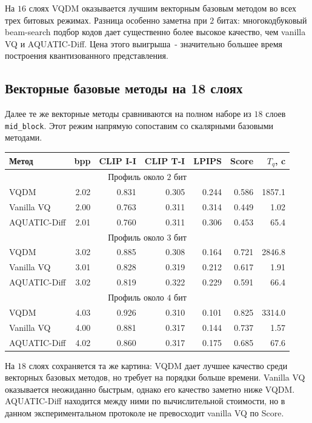 \documentclass[a4paper,12pt]{article}
\begin{document}
На $16$ слоях VQDM оказывается лучшим векторным базовым методом во всех трех битовых режимах. Разница особенно заметна при $2$ битах: многокодбуковый beam-search подбор кодов дает существенно более высокое качество, чем vanilla VQ и AQUATIC-Diff. Цена этого выигрыша~- значительно большее время построения квантизованного представления.

\subsection{Векторные базовые методы на 18 слоях}

Далее те же векторные методы сравниваются на полном наборе из $18$ слоев \texttt{mid\_block}. Этот режим напрямую сопоставим со скалярными базовыми методами.

\begin{center}
\small
\begin{tabular}{lrrrrrr}
\hline
Метод & bpp & CLIP I-I & CLIP T-I & LPIPS & Score & $T_q$, c \\
\hline
\multicolumn{7}{c}{Профиль около $2$ бит} \\
\hline
VQDM & 2.02 & 0.831 & 0.305 & 0.244 & 0.586 & 1857.1 \\
Vanilla VQ & 2.00 & 0.763 & 0.311 & 0.314 & 0.449 & 1.02 \\
AQUATIC-Diff & 2.01 & 0.760 & 0.311 & 0.306 & 0.453 & 65.4 \\
\hline
\multicolumn{7}{c}{Профиль около $3$ бит} \\
\hline
VQDM & 3.02 & 0.885 & 0.308 & 0.164 & 0.721 & 2846.8 \\
Vanilla VQ & 3.01 & 0.828 & 0.319 & 0.212 & 0.617 & 1.91 \\
AQUATIC-Diff & 3.02 & 0.819 & 0.322 & 0.229 & 0.591 & 66.4 \\
\hline
\multicolumn{7}{c}{Профиль около $4$ бит} \\
\hline
VQDM & 4.03 & 0.926 & 0.310 & 0.101 & 0.825 & 3314.0 \\
Vanilla VQ & 4.00 & 0.881 & 0.317 & 0.144 & 0.737 & 1.57 \\
AQUATIC-Diff & 4.02 & 0.860 & 0.317 & 0.175 & 0.685 & 67.6 \\
\hline
\end{tabular}
\end{center}

На $18$ слоях сохраняется та же картина: VQDM дает лучшее качество среди векторных базовых методов, но требует на порядки больше времени. Vanilla VQ оказывается неожиданно быстрым, однако его качество заметно ниже VQDM. AQUATIC-Diff находится между ними по вычислительной стоимости, но в данном экспериментальном протоколе не превосходит vanilla VQ по Score.
\end{document}

